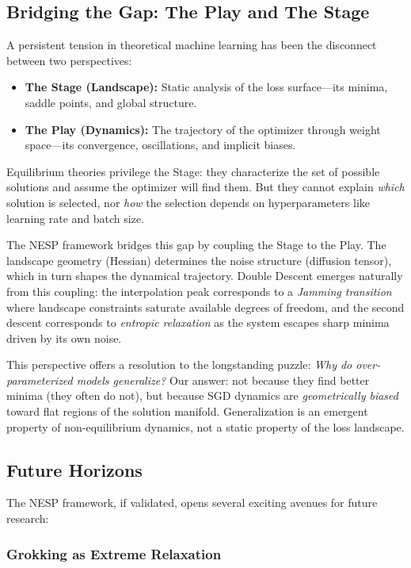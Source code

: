 \documentclass[
  journal=largetwo,
  year=2025,
  volume=37,
]{cup-journal}
\begin{document}
\subsection{Bridging the Gap: The Play and The Stage}

A persistent tension in theoretical machine learning has been the disconnect between two perspectives:
\begin{itemize}
    \item \textbf{The Stage (Landscape):} Static analysis of the loss surface---its minima, saddle points, and global structure.
    \item \textbf{The Play (Dynamics):} The trajectory of the optimizer through weight space---its convergence, oscillations, and implicit biases.
\end{itemize}

Equilibrium theories privilege the Stage: they characterize the set of possible solutions and assume the optimizer will find them. But they cannot explain \textit{which} solution is selected, nor \textit{how} the selection depends on hyperparameters like learning rate and batch size.

The NESP framework bridges this gap by coupling the Stage to the Play. The landscape geometry (Hessian) determines the noise structure (diffusion tensor), which in turn shapes the dynamical trajectory. Double Descent emerges naturally from this coupling: the interpolation peak corresponds to a \textit{Jamming transition} where landscape constraints saturate available degrees of freedom, and the second descent corresponds to \textit{entropic relaxation} as the system escapes sharp minima driven by its own noise.

This perspective offers a resolution to the longstanding puzzle: \textit{Why do over-parameterized models generalize?} Our answer: not because they find better minima (they often do not), but because SGD dynamics are \textit{geometrically biased} toward flat regions of the solution manifold. Generalization is an emergent property of non-equilibrium dynamics, not a static property of the loss landscape.

\subsection{Future Horizons}

The NESP framework, if validated, opens several exciting avenues for future research:

\subsubsection{Grokking as Extreme Relaxation}
\end{document}
